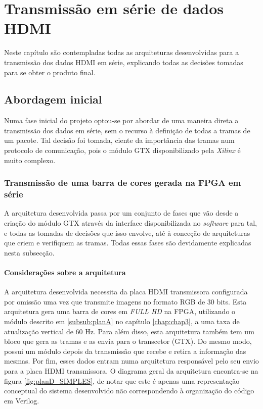\chapter{Transmissão em série de dados HDMI} \label{chap:chap5}

Neste capítulo são contempladas todas as arquiteturas desenvolvidas para a transmissão dos dados HDMI em série, explicando todas as decisões tomadas para se obter o produto final. 

\section{Abordagem inicial}

Numa fase inicial do projeto optou-se por abordar de uma maneira direta a transmissão dos dados em série, sem o recurso à definição de todas a tramas de um pacote. Tal decisão foi tomada, ciente da importância das tramas num protocolo de comunicação, pois o módulo GTX disponibilizado pela \textit{Xilinx} é muito complexo.

\subsection{Transmissão de uma barra de cores gerada na FPGA em série} \label{sub:planD}

A arquitetura desenvolvida passa por um conjunto de fases que vão desde a criação do módulo GTX através da interface disponibilizada no \textit{software} para tal, e todas as tomadas de decisões que isso envolve, até à conceção de arquiteturas que criem e verifiquem as tramas. Todas essas fases são devidamente explicadas nesta subsecção.

\subsubsection{Considerações sobre a arquitetura} \label{subsub:planD_considerações}

A arquitetura desenvolvida necessita da placa HDMI transmissora configurada por omissão uma vez que transmite imagens no formato RGB de 30 bits.  Esta arquitetura gera uma barra de cores em \textit{FULL HD} na FPGA, utilizando o módulo descrito em \ref{subsub:planA} no capítulo \ref{chap:chap3}, a uma taxa de atualização vertical de 60 Hz. Para além disso, esta arquitetura também tem um bloco que gera as tramas e as envia para o transcetor (GTX). Do mesmo modo, possui um módulo depois da transmissão que recebe e retira a informação das mesmas. Por fim, esses dados entram numa arquitetura responsável pelo seu envio para a placa HDMI transmissora. O diagrama geral da arquitetura encontra-se na figura \ref{fig:planD_SIMPLES}, de notar que este é apenas uma representação conceptual do sistema desenvolvido não correspondendo à organização do código em Verilog.



